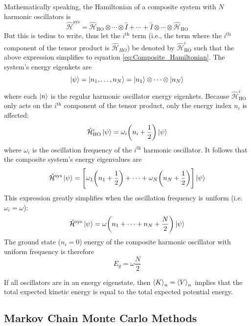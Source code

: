 \documentclass[nofootinbib,reprint,english]{revtex4-1}
\newcommand{\hatHH}{\hat{\mathcal{H}}}
\begin{document}
Mathematically speaking, the Hamiltonian of a composite system with \(N\) harmonic oscillators is
\begin{equation}
\hatHH^\text{sys}=\hatHH_\text{HO}\otimes\cdots\otimes\hat{I}+\cdots+\hat{I}\otimes\cdots\otimes\hatHH_\text{HO}
\end{equation}
But this is tedius to write, thus let the \(i^\text{th}\) term (i.e., the term where the \(i^\text{th}\) component of the tensor product is \(\hatHH_{HO}\)) be denoted by \(\hatHH_\text{HO}^i\) such that the above expression simplifies to equation \eqref{eq:Composite_Hamiltonian}. The system's energy eigenkets are
\begin{equation}\label{eq:composite_harmonic_oscillator_state}
\ket{\psi}=\ket{n_1,\ldots,n_N}=\ket{n_1}\otimes\cdots\otimes\ket{n_N}
\end{equation}
where each \(\ket{n}\) is the regular harmonic oscillator energy eigenkets. Because \(\hatHH_\text{HO}^i\) only acts on the \(i^\text{th}\) component of the tensor product, only the energy index \(n_i\) is affected:
\begin{equation}
\hatHH_\text{HO}^i\ket{\psi}=\omega_i\bigg(n_i+\frac{1}{2}\bigg)\ket{\psi}
\end{equation}
where \(\omega_i\) is the oscillation frequency of the \(i^\text{th}\) harmonic oscillator. It follows that the composite system's energy eigenvalues are
\begin{equation}\label{eq:composite_harmonic_oscillator_energy}
\hatHH^\text{sys}\ket{\psi}=\Bigg[\omega_1\bigg(n_1+\frac{1}{2}\bigg)+\cdots+\omega_N\bigg(n_N+\frac{1}{2}\bigg)\Bigg]\ket{\psi}
\end{equation}
This expression greatly simplifies when the oscillation frequency is uniform (i.e. \(\omega_i=\omega\)):
\begin{equation}\label{eq:composite_harmonic_oscillator_energy_unifreq}
\hatHH^\text{sys}\ket{\psi}=\omega\bigg(n_1+\cdots+n_N+\frac{N}{2}\bigg)\ket{\psi}
\end{equation}
The ground state (\(n_i=0\)) energy of the composite harmonic oscillator with uniform frequency is therefore
\begin{equation}\label{eq:composite_harmonic_oscillator_ground_energy}
E_g=\omega\frac{N}{2}
\end{equation}

If all oscillators are in an energy eigenstate, then \(\expval{K}_n=\expval{V}_n\) implies that the total expected kinetic energy is equal to the total expected potential energy.
\newpage
\subsection{Markov Chain Monte Carlo Methods}
\end{document}
